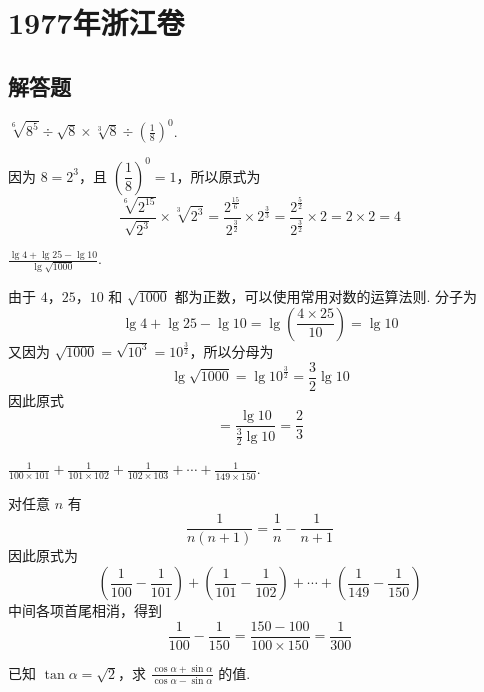 \chapter{1977年浙江卷}

\section{解答题}

\begin{problem}
\( \sqrt[6]{8^5}\div\sqrt{8}\times\sqrt[3]{8}\div\left( \frac{1}{8} \right)^0 \).
\end{problem}

\begin{solution}
因为 \(8=2^3\)，且 \(\left(\dfrac{1}{8}\right)^0=1\)，所以原式为
\[
\frac{\sqrt[6]{2^{15}}}{\sqrt{2^3}}\times\sqrt[3]{2^3}
=\frac{2^{\frac{15}{6}}}{2^{\frac{3}{2}}}\times2^{\frac{3}{3}}
=\frac{2^{\frac{5}{2}}}{2^{\frac{3}{2}}}\times2
=2\times2=4
\]
\end{solution}

\begin{problem}
\( \frac{\lg 4+\lg 25-\lg 10}{\lg \sqrt{1000}} \).
\end{problem}

\begin{solution}
由于 \(4\)，\(25\)，\(10\) 和 \(\sqrt{1000}\) 都为正数，可以使用常用对数的运算法则. 分子为
\[
\lg4+\lg25-\lg10
=\lg\left(\frac{4\times25}{10}\right)
=\lg10
\]
又因为 \(\sqrt{1000}=\sqrt{10^3}=10^{\frac{3}{2}}\)，所以分母为
\[
\lg\sqrt{1000}=\lg10^{\frac{3}{2}}=\frac{3}{2}\lg10
\]
因此原式
\[
=\frac{\lg10}{\frac{3}{2}\lg10}=\frac{2}{3}
\]
\end{solution}

\begin{problem}
\( \frac{1}{100\times 101}+\frac{1}{101\times 102}+\frac{1}{102\times 103}+\cdots+\frac{1}{149\times 150} \).
\end{problem}

\begin{solution}
对任意 \(n\) 有
\[
\frac{1}{n\left(n+1\right)}=\frac{1}{n}-\frac{1}{n+1}
\]
因此原式为
\[
\left(\frac{1}{100}-\frac{1}{101}\right)+\left(\frac{1}{101}-\frac{1}{102}\right)+\cdots+\left(\frac{1}{149}-\frac{1}{150}\right)
\]
中间各项首尾相消，得到
\[
\frac{1}{100}-\frac{1}{150}=\frac{150-100}{100\times150}=\frac{1}{300}
\]
\end{solution}

\begin{problem}
已知 \(\tan\alpha=\sqrt{2}\)，求 \(\frac{\cos\alpha+\sin\alpha}{\cos\alpha-\sin\alpha}\) 的值.
\end{problem}

